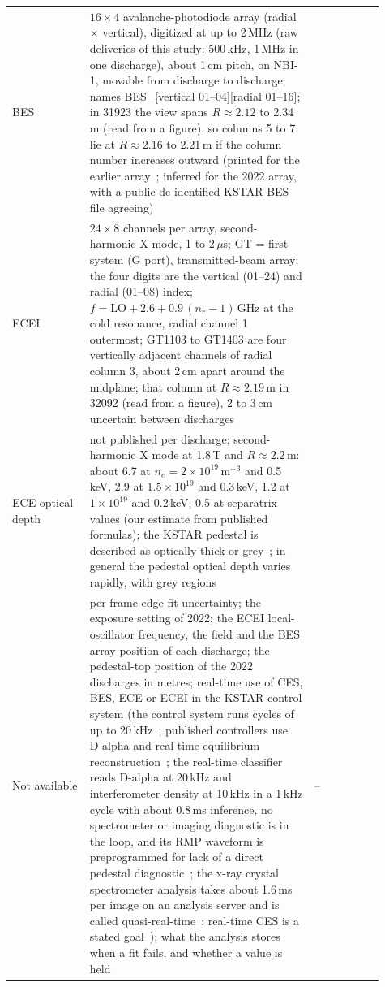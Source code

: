 \begin{table}[p]
\begin{tabular}{p{0.19\linewidth}p{0.55\linewidth}p{0.17\linewidth}}
    BES & $16\times4$ avalanche-photodiode array (radial $\times$ vertical), digitized at up to 2\,MHz (raw deliveries of this study: 500\,kHz, 1\,MHz in one discharge), about 1\,cm pitch, on NBI-1, movable from discharge to discharge; names BES\_[vertical 01--04][radial 01--16]; in 31923 the view spans $R \approx 2.12$ to 2.34\,m (read from a figure), so columns 5 to 7 lie at $R \approx 2.16$ to 2.21\,m if the column number increases outward (printed for the earlier array~\citep{Nam2014EdgeElectron}; inferred for the 2022 array, with a public de-identified KSTAR BES file agreeing) & \citep{Lampert2015CombinedHydrogen,Heo2025ExperimentalIdentification,KFE2026DiagnosticsDataUserGuide,Joung2026PhysicsInformedPreprocessing} \\
    ECEI & $24\times8$ channels per array, second-harmonic X mode, 1 to 2\,$\mu$s; GT = first system (G port), transmitted-beam array; the four digits are the vertical (01--24) and radial (01--08) index; $f = \mathrm{LO} + 2.6 + 0.9\,(n_r - 1)$\,GHz at the cold resonance, radial channel 1 outermost; GT1103 to GT1403 are four vertically adjacent channels of radial column 3, about 2\,cm apart around the midplane; that column at $R \approx 2.19$\,m in 32092 (read from a figure), 2 to 3\,cm uncertain between discharges & \citep{Yun2014Quasi3d,Yun2011TwoDimensionalVisualization,Lee2026SpatiotemporalStructure,fluctana,syndia,KFE2026DiagnosticsDataUserGuide} \\
    ECE optical depth & not published per discharge; second-harmonic X mode at 1.8\,T and $R \approx 2.2$\,m: about 6.7 at $n_e = 2\times10^{19}$\,m$^{-3}$ and 0.5\,keV, 2.9 at $1.5\times10^{19}$ and 0.3\,keV, 1.2 at $1\times10^{19}$ and 0.2\,keV, 0.5 at separatrix values (our estimate from published formulas); the KSTAR pedestal is described as optically thick or grey~\citep{Yun2011TwoDimensionalVisualization}; in general the pedestal optical depth varies rapidly, with grey regions~\citep{Zhu2019NewTrends} & \citep{Yun2011TwoDimensionalVisualization,Zhu2019NewTrends} \\
    Not available & per-frame edge fit uncertainty; the exposure setting of 2022; the ECEI local-oscillator frequency, the field and the BES array position of each discharge; the pedestal-top position of the 2022 discharges in metres; real-time use of CES, BES, ECE or ECEI in the KSTAR control system (the control system runs cycles of up to 20\,kHz~\citep{Hahn2018AchievementsLessons}; published controllers use D-alpha and real-time equilibrium reconstruction~\citep{Kim2024HighestFusion}; the real-time classifier reads D-alpha at 20\,kHz and interferometer density at 10\,kHz in a 1\,kHz cycle with about 0.8\,ms inference, no spectrometer or imaging diagnostic is in the loop, and its RMP waveform is preprogrammed for lack of a direct pedestal diagnostic~\citep{Shin2022PreemptiveDriven}; the x-ray crystal spectrometer analysis takes about 1.6\,ms per image on an analysis server and is called quasi-real-time~\citep{Kim2023LabviewProgramming}; real-time CES is a stated goal~\citep{Lee2026NeuralNetworkbased}); what the analysis stores when a fit fails, and whether a value is held & -- \\

\end{tabular}
\end{table}
